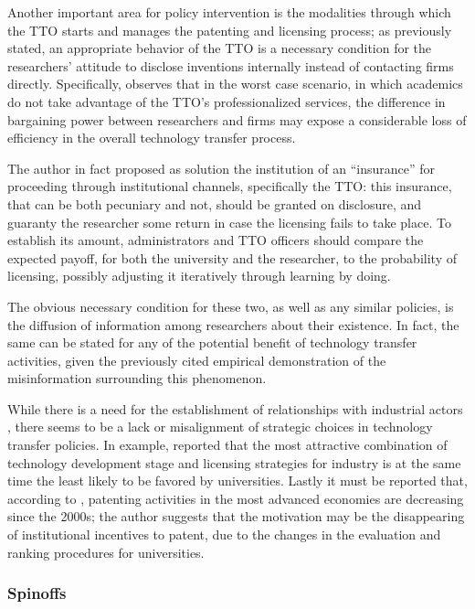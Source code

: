 Another important area for policy intervention is the modalities through which the TTO starts and manages the patenting and licensing process; as previously stated, an appropriate behavior of the TTO is a necessary condition for the researchers' attitude to disclose inventions internally instead of contacting firms directly. Specifically, \citet{Panagopoulos2013} observes that in the worst case scenario, in which academics do not take advantage of the TTO's professionalized services, the difference in bargaining power between researchers and firms may expose a considerable loss of efficiency in the overall technology transfer process.

The author in fact proposed as solution the institution of an \enquote{insurance} for proceeding through institutional channels, specifically the TTO: this insurance, that can be both pecuniary and not, should be granted on disclosure, and guaranty the researcher some return in case the licensing fails to take place. To establish its amount, administrators and TTO officers should compare the expected payoff, for both the university and the researcher, to the probability of licensing, possibly adjusting it iteratively through learning by doing.

The obvious necessary condition for these two, as well as any similar policies, is the diffusion of information among researchers about their existence. In fact, the same can be stated for any of the potential benefit of technology transfer activities, given the previously cited empirical demonstration of the misinformation surrounding this phenomenon. 

While there is a need for the establishment of relationships with industrial actors \citep{Baldini2007}, there seems to be a lack or misalignment of strategic choices in technology transfer policies. In example, \citet{Phan2005} reported that the most attractive combination of technology development stage and licensing strategies for industry is at the same time the least likely to be favored by universities. Lastly it must be reported that, according to \citet{Leydesdorff2010}, patenting activities in the most advanced economies are decreasing since the 2000s; the author suggests that the motivation may be the disappearing of institutional incentives to patent, due to the changes in the evaluation and ranking procedures for universities.

\subsubsection{Spinoffs}

